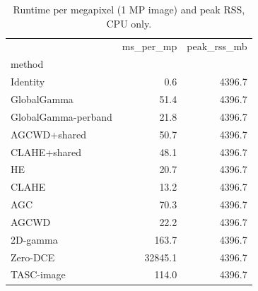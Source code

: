 \begin{table}[t]
\caption{Runtime per megapixel (1 MP image) and peak RSS, CPU only.}
\label{tab:efficiency}
\begin{tabular}{lrr}
\toprule
 & ms\_per\_mp & peak\_rss\_mb \\
method &  &  \\
\midrule
Identity & 0.6 & 4396.7 \\
GlobalGamma & 51.4 & 4396.7 \\
GlobalGamma-perband & 21.8 & 4396.7 \\
AGCWD+shared & 50.7 & 4396.7 \\
CLAHE+shared & 48.1 & 4396.7 \\
HE & 20.7 & 4396.7 \\
CLAHE & 13.2 & 4396.7 \\
AGC & 70.3 & 4396.7 \\
AGCWD & 22.2 & 4396.7 \\
2D-gamma & 163.7 & 4396.7 \\
Zero-DCE & 32845.1 & 4396.7 \\
TASC-image & 114.0 & 4396.7 \\
\bottomrule
\end{tabular}
\end{table}
